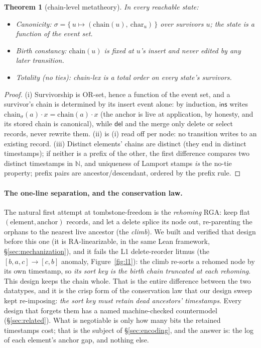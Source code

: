 \documentclass[11pt]{article}
\newtheorem{theorem}{Theorem}
\newcommand{\del}{\mathsf{del}}
\newcommand{\ins}{\mathsf{ins}}
\newcommand{\chain}{\mathrm{chain}}
\begin{document}
\begin{theorem}[chain-level metatheory]\label{thm:chain}
In every reachable state:
\begin{itemize}
\item[(i)] \emph{Canonicity:} $\sigma = \{\,u \mapsto (\chain(u),\
\mathrm{char}_u)\,\}$ over survivors $u$; the state is a function
of the event set.
\item[(ii)] \emph{Birth constancy:} $\chain(u)$ is fixed at $u$'s
insert and never edited by any later transition.
\item[(iii)] \emph{Totality (no ties):} chain-lex is a total order
on every state's survivors.
\end{itemize}
\end{theorem}
\begin{proof}
(i) Survivorship is OR-set, hence a function of the event set, and a
survivor's chain is determined by its insert event alone: by
induction, $\ins$ writes $\chain_\sigma(a) \cdot x = \chain(a) \cdot
x$ (the anchor is live at application, by honesty, and its stored
chain is canonical), while $\del$ and the merge only delete or select
records, never rewrite them. (ii) is (i) read off per node: no
transition writes to an existing record. (iii) Distinct elements'
chains are distinct (they end in distinct timestamps); if neither is a
prefix of the other, the first difference compares two distinct
timestamps in $\mathbb{N}$, and uniqueness of Lamport stamps \emph{is}
the no-tie property; prefix pairs are ancestor/descendant, ordered by
the prefix rule.
\end{proof}

\paragraph{The one-line separation, and the conservation law.} The
natural first attempt at tombstone-freedom is the \emph{rehoming}
RGA: keep flat $(\mathrm{element}, \mathrm{anchor})$ records, and let
a delete splice its node out, re-parenting the orphans to the nearest
live ancestor (the \emph{climb}). We built and verified that design
before this one (it is RA-linearizable, in the same Lean framework,
\S\ref{sec:mechanization}), and it fails the L1 delete-reorder litmus
(the $[b,a,c] \to [c,b]$ anomaly, Figure~\ref{fig:l1}): the climb
re-sorts a rehomed node by its own timestamp, so \emph{its sort key
is the birth chain truncated at each rehoming}. This design keeps the
chain whole. That is the entire difference
between the two datatypes,
and it is the crisp form of the conservation law that our design
sweep kept re-imposing:
\emph{the sort key must retain dead ancestors' timestamps}. Every
design that forgets them has a named machine-checked countermodel
(\S\ref{sec:related}). What is negotiable is only how many bits the
retained timestamps cost; that is the subject of
\S\ref{sec:encoding}, and the answer is: the log of each element's
anchor gap, and nothing else.
\end{document}
